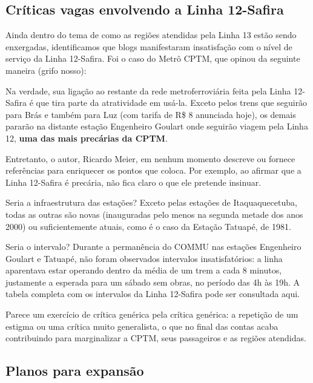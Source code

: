 \documentclass[11pt,fleqn]{book} %
\begin{document}
\subsection{Críticas vagas envolvendo a Linha 12-Safira}

Ainda dentro do tema de como as regiões atendidas pela Linha 13 estão sendo enxergadas, identificamos que blogs manifestaram insatisfação com o nível de serviço da Linha 12-Safira. Foi o caso do Metrô CPTM, que opinou da seguinte maneira (grifo nosso):

\begin{citacao}
	Na verdade, sua ligação ao restante da rede metroferroviária feita pela Linha 12-Safira é que tira parte da atratividade em usá-la. Exceto pelos trens que seguirão para Brás e também para Luz (com tarifa de R\$ 8 anunciada hoje), os demais pararão na distante estação Engenheiro Goulart onde seguirão viagem pela Linha 12, \textbf{uma das mais precárias da CPTM}.
\end{citacao}

Entretanto, o autor, Ricardo Meier, em nenhum momento descreve ou fornece referências para enriquecer os pontos que coloca. Por exemplo, ao afirmar que a Linha 12-Safira é precária, não fica claro o que ele pretende insinuar.

Seria a infraestrutura das estações? Exceto pelas estações de Itaquaquecetuba, todas as outras são novas (inauguradas pelo menos na segunda metade dos anos 2000) ou suficientemente atuais, como é o caso da Estação Tatuapé, de 1981.

Seria o intervalo? Durante a permanência do COMMU nas estações Engenheiro Goulart e Tatuapé, não foram observados intervalos insatisfatórios: a linha aparentava estar operando dentro da média de um trem a cada 8 minutos, justamente a esperada para um sábado sem obras, no período das 4h às 19h. A tabela completa com os intervalos da Linha 12-Safira pode ser consultada aqui.


Parece um exercício de crítica genérica pela crítica genérica: a repetição de um estigma ou uma crítica muito generalista, o que no final das contas acaba contribuindo para marginalizar a CPTM, seus passageiros e as regiões atendidas.

\subsection{Planos para expansão}
\end{document}

